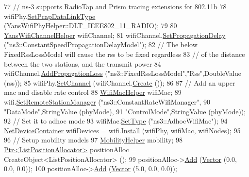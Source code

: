 \begin{DoxyCode}
77   \textcolor{comment}{// ns-3 supports RadioTap and Prism tracing extensions for 802.11b}
78   wifiPhy.\hyperlink{classns3_1_1WifiPhyHelper_ae4b90e90f6e78a19c1b7fdf08b270218}{SetPcapDataLinkType} (YansWifiPhyHelper::DLT\_IEEE802\_11\_RADIO);
79 
80   \hyperlink{classns3_1_1YansWifiChannelHelper}{YansWifiChannelHelper} wifiChannel;
81   wifiChannel.\hyperlink{classns3_1_1YansWifiChannelHelper_a6b452ba53ccaee6ca000cc72ed9ea0fa}{SetPropagationDelay} (\textcolor{stringliteral}{"ns3::ConstantSpeedPropagationDelayModel"});
82   \textcolor{comment}{// The below FixedRssLossModel will cause the rss to be fixed regardless}
83   \textcolor{comment}{// of the distance between the two stations, and the transmit power}
84   wifiChannel.\hyperlink{classns3_1_1YansWifiChannelHelper_a71c64d54e148b43698c65736e1c77156}{AddPropagationLoss} (\textcolor{stringliteral}{"ns3::FixedRssLossModel"},\textcolor{stringliteral}{"Rss"},DoubleValue (rss));
85   wifiPhy.\hyperlink{classns3_1_1YansWifiPhyHelper_ad2e9a27587dd4ff320435c93cc2676de}{SetChannel} (wifiChannel.\hyperlink{classns3_1_1YansWifiChannelHelper_a0532e292ab9452f3cf630c848708e563}{Create} ());
86 
87   \textcolor{comment}{// Add an upper mac and disable rate control}
88   \hyperlink{classns3_1_1WifiMacHelper}{WifiMacHelper} wifiMac;
89   wifi.\hyperlink{classns3_1_1WifiHelper_a3d01b178aeb2de246ab5a3aa5638ce24}{SetRemoteStationManager} (\textcolor{stringliteral}{"ns3::ConstantRateWifiManager"},
90                                 \textcolor{stringliteral}{"DataMode"},StringValue (phyMode),
91                                 \textcolor{stringliteral}{"ControlMode"},StringValue (phyMode));
92   \textcolor{comment}{// Set it to adhoc mode}
93   wifiMac.\hyperlink{classns3_1_1WifiMacHelper_a382d8df76a1dd7007179d1963b4b6bc6}{SetType} (\textcolor{stringliteral}{"ns3::AdhocWifiMac"});
94   \hyperlink{classns3_1_1NetDeviceContainer}{NetDeviceContainer} wifiDevices = wifi.\hyperlink{classns3_1_1WifiHelper_a451b3d33fa1497c22f06c5451f57a127}{Install} (wifiPhy, wifiMac, wifiNodes);
95 
96   \textcolor{comment}{// Setup mobility models}
97   \hyperlink{classns3_1_1MobilityHelper}{MobilityHelper} mobility;
98   \hyperlink{classns3_1_1Ptr}{Ptr<ListPositionAllocator>} positionAlloc = CreateObject<ListPositionAllocator> 
      ();
99   positionAlloc->\hyperlink{classns3_1_1ListPositionAllocator_a460e82f015ac012a73ba0ea0cccb3486}{Add} (\hyperlink{classns3_1_1Vector3D_a7e59b47bc94c9cb1dadff68c1d0112d8}{Vector} (0.0, 0.0, 0.0));
100   positionAlloc->\hyperlink{classns3_1_1ListPositionAllocator_a460e82f015ac012a73ba0ea0cccb3486}{Add} (\hyperlink{classns3_1_1Vector3D_a7e59b47bc94c9cb1dadff68c1d0112d8}{Vector} (5.0, 0.0, 0.0));

\end{DoxyCode}
